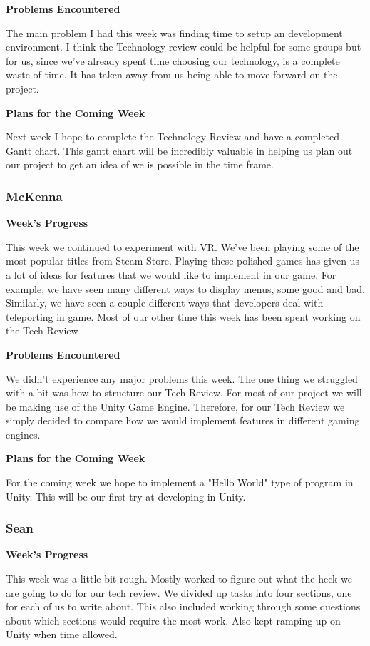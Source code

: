 \documentclass[10pt,journal,compsoc,onecolumn, draftclsnofoot]{IEEEtran}
\begin{document}
\noindent \textbf{Problems Encountered}

The main problem I had this week was finding time to setup an development environment. I think the Technology review could be helpful for some groups but for us, since we've already spent time choosing our technology, is a complete waste of time. It has taken away from us being able to move forward on the project.

\noindent \textbf{Plans for the Coming Week}

Next week I hope to complete the Technology Review and have a completed Gantt chart. This gantt chart will be incredibly valuable in helping us plan out our project to get an idea of we is possible in the time frame.

\subsubsection{McKenna}
\noindent \textbf{Week's Progress}

This week we continued to experiment with VR. We've been playing some of the most popular titles from Steam Store. Playing these polished games has given us a lot of ideas for features that we would like to implement in our game. For example, we have seen many different ways to display menus, some good and bad. Similarly, we have seen a couple different ways that developers deal with teleporting in game. Most of our other time this week has been spent working on the Tech Review

\noindent \textbf{Problems Encountered}

We didn't experience any major problems this week. The one thing we struggled with a bit was how to structure our Tech Review. For most of our project we will be making use of the Unity Game Engine. Therefore, for our Tech Review we simply decided to compare how we would implement features in different gaming engines.

\noindent \textbf{Plans for the Coming Week}

For the coming week we hope to implement a "Hello World" type of program in Unity. This will be our first try at developing in Unity.

\subsubsection{Sean}
\noindent \textbf{Week's Progress}

This week was a little bit rough.  Mostly worked to figure out what the heck we are going to do for our tech review.  We divided up tasks into four sections, one for each of us to write about.  This also included working through some questions about which sections would require the most work.  Also kept ramping up on Unity when time allowed.
\end{document}
